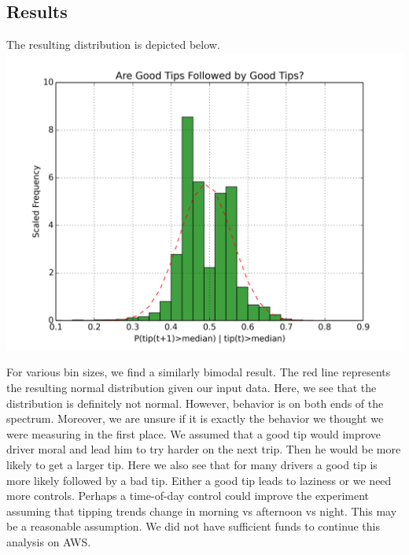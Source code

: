 \documentclass[twoside]{article}
\begin{document}
\begin{multicols}{2}
\subsection{Results}
The resulting distribution is depicted below. 
\includegraphics[scale=.35]{hothand.png}

For various bin sizes, we find a similarly bimodal result. The red line represents the resulting normal distribution given our input data. Here, we see that the distribution is definitely not normal. However, behavior is on both ends of the spectrum. Moreover, we are unsure if it is exactly the behavior we thought we were measuring in the first place. We assumed that a good tip would improve driver moral and lead him to try harder on the next trip.  Then he would be more likely to get a larger tip.  Here we also see that for many drivers a good tip is more likely followed by a bad tip.  Either a good tip leads to laziness or we need more controls. Perhaps a time-of-day control could improve the experiment assuming that tipping trends change in morning vs afternoon vs night. This may be a reasonable assumption. We did not have sufficient funds to continue this analysis on AWS. 


\end{multicols}
\end{document}

